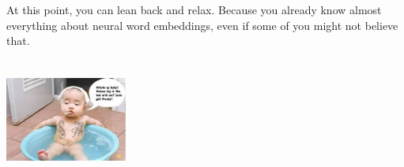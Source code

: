 \documentclass{beamer}
\begin{document}
    \begin{frame}
      \vfill \center At this point, you can lean back and relax.  Because you
      already know almost everything about neural word embeddings, even if
      some of you might not believe that.

      \includegraphics[height=4cm,width=4cm]{img/relax.jpg}
      \vfill
    \end{frame}
\end{document}
